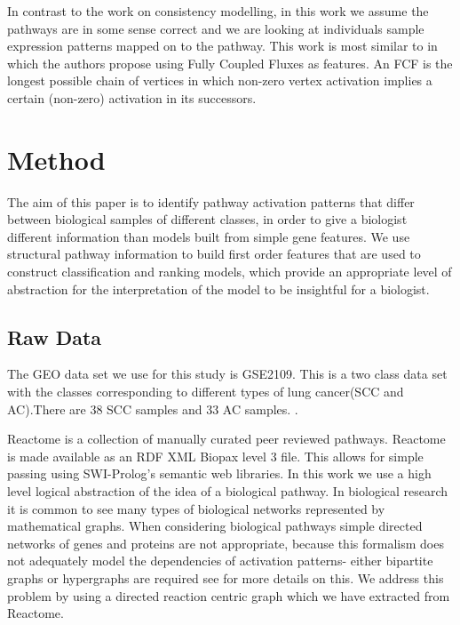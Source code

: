 \documentclass[runningheads,a4paper]{llncs}
\begin{document}
In contrast to the work on consistency modelling, in this work we assume the pathways are in some sense correct and we are looking at individuals sample expression patterns mapped on to the pathway. This work is most similar to  \citep{holec2008using} in which the authors propose using Fully Coupled Fluxes as features. An FCF is the longest possible chain of vertices in which non-zero vertex activation implies a certain (non-zero) activation in its successors.

%

	  
\section{Method}
The aim of this paper is to identify pathway activation patterns that differ between biological samples of different classes, in order to give a biologist different information than models built from simple gene features. We use structural pathway information to build first order features that are used to construct classification and ranking models, which  provide an appropriate level of abstraction for the interpretation of the model to be insightful for a biologist. 
\subsection{Raw Data}
The GEO data set we use for this study is GSE2109. This is a two class data set with the classes corresponding to different types of lung cancer(SCC and AC).There are 38 SCC samples and 33 AC samples. .
	
Reactome \citep{croft_reactome_2013} is a collection of manually curated peer reviewed pathways. Reactome is made available as an RDF XML Biopax level 3 file. This allows for simple passing using SWI-Prolog's semantic web libraries. 
In this work we use a high level logical abstraction of the idea of a biological pathway. In biological research it is common to see many types of biological networks represented by mathematical graphs. When considering biological pathways simple directed networks of genes and proteins are not appropriate, because this formalism does not adequately model the dependencies of activation patterns- either bipartite graphs or hypergraphs are required see \citep{whelan2011representation} for more details on this. We address this problem by using a directed reaction centric graph which we have extracted from Reactome.
\end{document}
